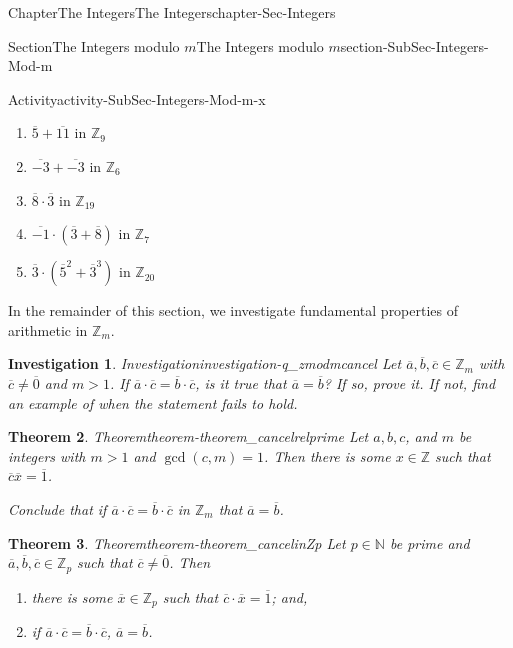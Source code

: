 \documentclass[oneside,10pt,]{book}
\numberwithin{equation}{section}
\def\Z{{\mathbb Z}}
\def\N{{\mathbb N}}
\newtheorem{theorem}{Theorem}[section]
\newtheorem{investigation}[theorem]{Investigation}
\begin{document}
\begin{chapterptx}{Chapter}{The Integers}{}{The Integers}{}{}{chapter-Sec-Integers}
\begin{sectionptx}{Section}{The Integers modulo \(m\)}{}{The Integers modulo \(m\)}{}{}{section-SubSec-Integers-Mod-m}
\begin{activity}{Activity}{}{activity-SubSec-Integers-Mod-m-x}
%
\begin{enumerate}
\item{}\(\overline{5}+\overline{11}\) in \(\Z_{9}\)%
\item{}\(\overline{-3}+\overline{-3}\) in \(\Z_{6}\)%
\item{}\(\overline{8}\cdot\overline{3}\) in \(\Z_{19}\)%
\item{}\(\overline{-1}\cdot(\overline{3}+\overline{8})\) in \(\Z_{7}\)%
\item{}\(\overline{3}\cdot(\overline{5}^2+\overline{3}^3)\) in \(\Z_{20}\)%
\end{enumerate}
\end{activity}%
In the remainder of this section, we investigate fundamental properties of arithmetic in \(\Z_m\).%
\begin{investigation}{Investigation}{}{investigation-q_zmodmcancel}%
Let \(\overline{a},\overline{b},\overline{c}\in \Z_m\) with \(\overline{c}\ne\overline{0}\) and \(m > 1\). If \(\overline{a}\cdot \overline{c} = \overline{b}\cdot \overline{c}\), is it true that \(\overline{a} = \overline{b}\)? If so, prove it. If not, find an example of when the statement fails to hold.%
\end{investigation}%
\begin{theorem}{Theorem}{}{}{theorem-theorem_cancelrelprime}%
Let \(a,b,c\), and \(m\) be integers with \(m > 1\) and \(\gcd(c,m)=1\). Then there is some \(x\in \Z\) such that \(\overline{c} \overline{x} = \overline{1}\).%
\par
Conclude that if \(\overline{a} \cdot\overline{c} = \overline{b}\cdot\overline{c}\) in \(\Z_m\) that \(\overline{a} = \overline{b}\).%
\end{theorem}
\begin{theorem}{Theorem}{}{}{theorem-theorem_cancelinZp}%
Let \(p\in \N\) be prime and \(\overline{a},\overline{b},\overline{c}\in \Z_p\) such that \(\overline{c}\ne \overline{0}\). Then%
\begin{enumerate}
\item{}there is some \(\overline{x}\in \Z_p\) such that \(\overline{c}\cdot \overline{x} = \overline{1}\); and,%
\item{}if \(\overline{a} \cdot\overline{c} = \overline{b}\cdot\overline{c}\), \(\overline{a} = \overline{b}\).%
\end{enumerate}
%
\end{theorem}
\end{sectionptx}
\end{chapterptx}
%
%
\typeout{************************************************}
\end{document}
